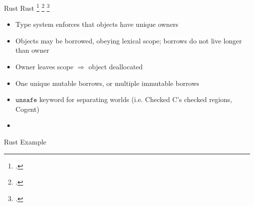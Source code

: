 \documentclass[aspectratio=169]{beamer}
\begin{document}
\begin{frame}{Rust}
    Rust \footcite{matsakis_rust_2014} \footcite{levy_ownership_2015} \footcite{jung_rustbelt:_2017}
    \begin{itemize}
        \item Type system enforces that objects have unique \alert{owners}
        \item Objects may be borrowed, obeying lexical scope; borrows do not live longer than owner
        \item Owner leaves scope $\Rightarrow$ object \alert{deallocated}
        \item One \alert{unique} mutable borrows, or multiple immutable borrows %
        \item $\texttt{unsafe}$ keyword for separating worlds (i.e. Checked C's checked regions, Cogent)
        \item {}
    \end{itemize}
\end{frame}


\begin{frame}{Rust Example}
\end{frame}

\end{document}
